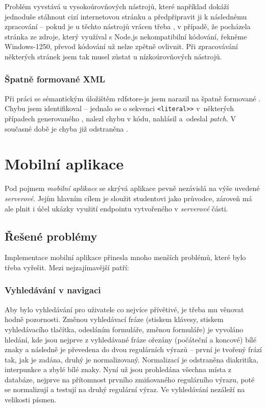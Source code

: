 Problém vyvstává u vysokoúrovňových nástrojů, které například dokáží jednoduše stáhnout cizí internetovou stránku a předpřipravit ji k následnému zpracování -- pokud je u těchto nástrojů vrácen třeba , v případě, že pocházela stránka ze zdroje, který využíval s Node.js nekompatibilní kódování, řekněme Windows-1250, převod kódování už nelze zpětně ovlivnit. Při zpracovávání některých stránek jsem tak musel zůstat u nízkoúrovňových nástrojů.

\subsubsection{Špatně formované XML}
Při práci se sémantickým úložištěm rdfstore-js jsem narazil na špatně formované . Chybu jsem identifikoval -- jednalo se o sekvenci \verb|<literal>>| v~některých případech generovaného , nalezl chybu v kódu, nahlásil a~odeslal \textit{patch}. V současné době je chyba již odstraněna \cite{IssueLiteral}.


\pagebreak
\section{Mobilní aplikace}
Pod pojmem \textit{mobilní aplikace} se skrývá aplikace pevně nezávislá na výše uvedené \textit{serverové}. Jejím hlavním cílem je sloužit studentovi   jako průvodce, zároveň má ale plnit i účel ukázky využití  endpointu vytvořeného v \textit{serverové} části.

\subsection{Řešené problémy}
Implementace mobilní aplikace přinesla mnoho menších problémů, které bylo třeba vyřešit. Mezi nejzajímavější patří:

\subsubsection{Vyhledávání v navigaci}
Aby bylo vyhledávání pro uživatele co nejvíce přívětivé, je třeba mu věnovat hodně pozornosti. Změnou vyhledávací fráze (stiskem klávesy, stiskem vyhledávacího tlačítka, odesláním formuláře, změnou formuláře) je vyvoláno hledání, kde jsou nejprve z vyhledávané fráze ořezány (počáteční a koncové) bílé znaky a následně je převedena do dvou regulárních výrazů -- první je tvořený frází tak, jak je zadána, druhý je normalizovaný. Normalizací je odstraněna diakritika, interpunkce a zbylé bílé znaky. Nyní už jsou prohledána všechna místa z databáze, nejprve na přítomnost prvního zmiňovaného regulárního výrazu, poté se normalizují a testují na druhý regulární výraz. Ve vyhledávání nezáleží na velikosti písmen.

